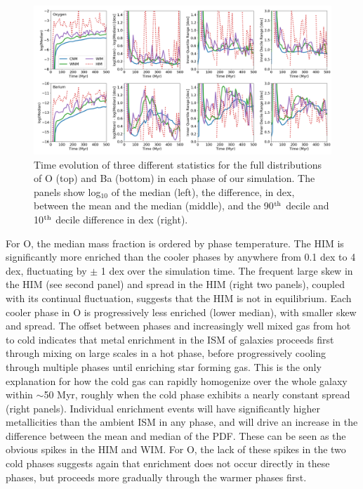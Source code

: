 \documentclass[twocolumn]{aastex61}
\begin{document}
\begin{figure}
\centering
\includegraphics[width=0.95\linewidth]{O_Ba_distribution_evolution.png}
\caption{Time evolution of three different statistics for the full distributions of O (top) and Ba (bottom) in each phase of our simulation. The panels show log$_{10}$ of the median (left), the difference, in dex, between the mean and the median (middle), and the 90$^{\rm th}$ decile and 10$^{\rm th}$ decile difference in dex (right).}
\label{fig:phase-statistics}
\end{figure}

For O, the median mass fraction is ordered by phase temperature. The HIM is significantly more enriched than the cooler phases by anywhere from 0.1 dex to 4 dex, fluctuating by $\pm$ 1 dex over the simulation time. The frequent large skew in the HIM (see second panel) and spread in the HIM (right two panels), coupled with its continual fluctuation, suggests that the HIM is not in equilibrium. 
Each cooler phase in O is progressively less enriched (lower median), with smaller skew and spread. The offset between phases and increasingly well mixed gas from hot to cold indicates that metal enrichment in the ISM of galaxies proceeds first through mixing on large scales in a hot phase, before progressively cooling through multiple phases until enriching star forming gas. This is the only explanation for how the cold gas can rapidly homogenize over the whole galaxy within $\sim$50 Myr, roughly when the cold phase exhibits a nearly constant spread (right panels). Individual enrichment events will have significantly higher metallicities than the ambient ISM in any phase, and will drive an increase in the difference between the mean and median of the PDF. These can be seen as the obvious spikes in the HIM and WIM. For O, the lack of these spikes in the two cold phases suggests again that enrichment does not occur directly in these phases, but proceeds more gradually through the warmer phases first.
\end{document}
